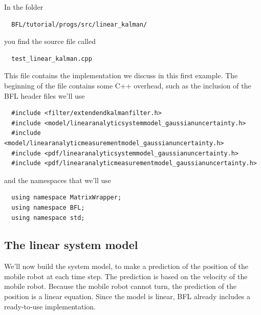 \documentclass[a4paper,10pt]{report}
\begin{document}
In the folder 
\begin{verbatim}
  BFL/tutorial/progs/src/linear_kalman/
\end{verbatim}
you find the source file called 
\begin{verbatim}
  test_linear_kalman.cpp
\end{verbatim}
This file contains the implementation we discuss in this first
example. The beginning of the file contains some C++ overhead, such as
the inclusion of the BFL header files we'll use
\begin{verbatim}
  #include <filter/extendendkalmanfilter.h>
  #include <model/linearanalyticsystemmodel_gaussianuncertainty.h>
  #include <model/linearanalyticmeasurementmodel_gaussianuncertainty.h>
  #include <pdf/linearanalyticsystemmodel_gaussianuncertainty.h>
  #include <pdf/linearanalyticmeasurementmodel_gaussianuncertainty.h>
\end{verbatim}
and the namespaces that we'll use
\begin{verbatim}
  using namespace MatrixWrapper;
  using namespace BFL;
  using namespace std;
\end{verbatim}


\subsection{The linear system model}
We'll now build the system model, to make a prediction of the position
of the mobile robot at each time step. The prediction is based on the
velocity of the mobile robot. Because the mobile robot cannot turn,
the prediction of the position is a linear equation. Since the model
is linear, BFL already includes a ready-to-use implementation.
\end{document}
